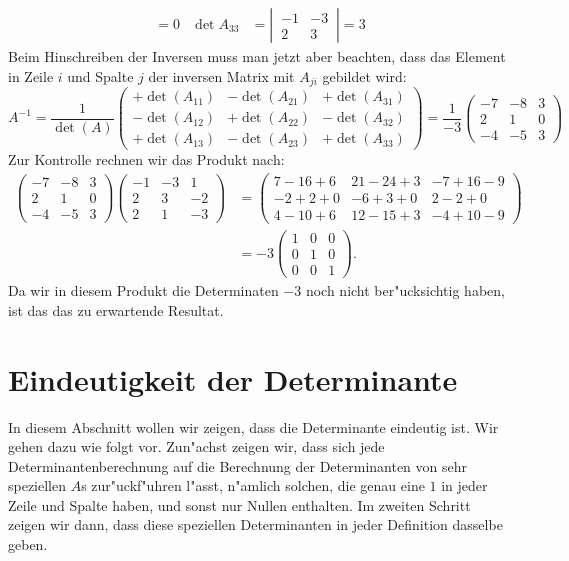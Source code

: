 \begin{beispiel}
\begin{align*}
=0
&
\det A_{33}&=\left|\,\begin{matrix}-1&-3\\ 2& 3\end{matrix}\,\right|
=3
\end{align*}
Beim Hinschreiben der Inversen muss man jetzt aber beachten,
dass das Element in Zeile $i$ und Spalte $j$ der inversen Matrix
mit $A_{ji}$ gebildet wird:
\[
A^{-1}=\frac1{\det(A)}\begin{pmatrix}
+\det(A_{11})&-\det(A_{21})&+\det(A_{31})\\
-\det(A_{12})&+\det(A_{22})&-\det(A_{32})\\
+\det(A_{13})&-\det(A_{23})&+\det(A_{33})
\end{pmatrix}
=\frac1{-3}\begin{pmatrix}
-7&-8& 3\\
 2& 1& 0\\
-4&-5& 3
\end{pmatrix}
\]
Zur Kontrolle rechnen wir das Produkt nach:
\begin{align*}
\begin{pmatrix}
-7&-8& 3\\
 2& 1& 0\\
-4&-5& 3
\end{pmatrix}
\begin{pmatrix}
-1&-3& 1\\
 2& 3&-2\\
 2& 1&-3
\end{pmatrix}
&=
\begin{pmatrix}
 7-16+6&21-24+3&-7+16-9\\
-2+ 2+0&-6+ 3+0& 2- 2+0\\
 4-10+6&12-15+3&-4+10-9
\end{pmatrix}
\\
&=-3\begin{pmatrix}
1&0&0\\
0&1&0\\
0&0&1
\end{pmatrix}.
\end{align*}
Da wir in diesem Produkt die Determinaten $-3$ noch nicht ber"ucksichtig
haben, ist das das zu erwartende Resultat.
\end{beispiel}

\section{Eindeutigkeit der Determinante\label{deteindeutig}}
In diesem Abschnitt wollen wir zeigen, dass die Determinante
eindeutig ist. Wir gehen dazu wie folgt vor. Zun"achst zeigen wir,
dass sich jede Determinantenberechnung auf die Berechnung der Determinanten
von sehr speziellen $A$s zur"uckf"uhren l"asst, n"amlich solchen,
die genau eine $1$ in jeder Zeile und Spalte haben, und sonst nur
Nullen enthalten. Im zweiten Schritt zeigen wir dann, dass diese
speziellen Determinanten in jeder Definition dasselbe geben.

